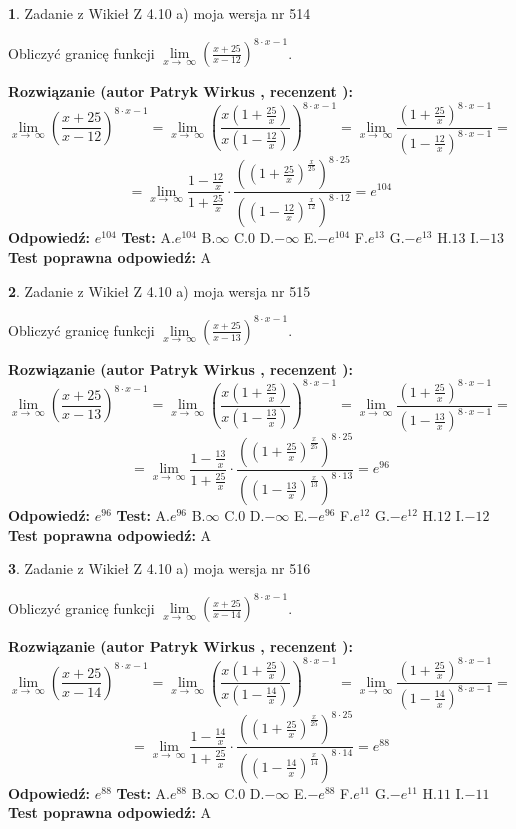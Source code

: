 \documentclass[12pt, a4paper]{article}
\theoremstyle{definition} %
\newtheorem{zad}{}
\newcommand{\zadStart}[1]{\begin{zad}#1\newline}
\newcommand{\zadStop}{\end{zad}}
\newcommand{\rozwStart}[2]{\noindent \textbf{Rozwiązanie (autor #1 , recenzent #2): }\newline}
\newcommand{\rozwStop}{\newline}
\newcommand{\odpStart}{\noindent \textbf{Odpowiedź:}\newline}
\newcommand{\odpStop}{\newline}
\newcommand{\testStart}{\noindent \textbf{Test:}\newline}
\newcommand{\testStop}{\newline}
\newcommand{\kluczStart}{\noindent \textbf{Test poprawna odpowiedź:}\newline}
\newcommand{\kluczStop}{\newline}
\begin{document}
\zadStart{Zadanie z Wikieł Z 4.10 a) moja wersja nr 514}

Obliczyć granicę funkcji  $\lim\limits_{x\to\ \infty}(\frac{x+25}{x-12})^{8\cdot x-1}$.
\zadStop
\rozwStart{Patryk Wirkus}{}
$$\lim\limits_{x\to\ \infty}(\frac{x+25}{x-12})^{8\cdot x-1} = \lim\limits_{x\to\ \infty}(\frac{x(1+\frac{25}{x})}{x(1-\frac{12}{x})})^{8\cdot x-1}=\lim\limits_{x\to\ \infty}\frac{(1+\frac{25}{x})^{8\cdot x-1}}{(1-\frac{12}{x})^{8\cdot x-1}}=$$
$$=\lim\limits_{x\to\ \infty}\frac{1-\frac{12}{x}}{1+\frac{25}{x}}\cdot\frac{((1+\frac{25}{x})^{\frac{x}{25}})^{8\cdot25}}{((1-\frac{12}{x})^{\frac{x}{12}})^{8\cdot12}}=e^{104}$$
\rozwStop
\odpStart
$e^{104}$
\odpStop
\testStart
A.$e^{104}$ B.$\infty$ C.$0$ D.$-\infty$ E.$-e^{104}$
F.$e^{13}$ G.$-e^{13}$
H.$13$
I.$-13$
\testStop
\kluczStart
A
\kluczStop



\zadStart{Zadanie z Wikieł Z 4.10 a) moja wersja nr 515}

Obliczyć granicę funkcji  $\lim\limits_{x\to\ \infty}(\frac{x+25}{x-13})^{8\cdot x-1}$.
\zadStop
\rozwStart{Patryk Wirkus}{}
$$\lim\limits_{x\to\ \infty}(\frac{x+25}{x-13})^{8\cdot x-1} = \lim\limits_{x\to\ \infty}(\frac{x(1+\frac{25}{x})}{x(1-\frac{13}{x})})^{8\cdot x-1}=\lim\limits_{x\to\ \infty}\frac{(1+\frac{25}{x})^{8\cdot x-1}}{(1-\frac{13}{x})^{8\cdot x-1}}=$$
$$=\lim\limits_{x\to\ \infty}\frac{1-\frac{13}{x}}{1+\frac{25}{x}}\cdot\frac{((1+\frac{25}{x})^{\frac{x}{25}})^{8\cdot25}}{((1-\frac{13}{x})^{\frac{x}{13}})^{8\cdot13}}=e^{96}$$
\rozwStop
\odpStart
$e^{96}$
\odpStop
\testStart
A.$e^{96}$ B.$\infty$ C.$0$ D.$-\infty$ E.$-e^{96}$
F.$e^{12}$ G.$-e^{12}$
H.$12$
I.$-12$
\testStop
\kluczStart
A
\kluczStop



\zadStart{Zadanie z Wikieł Z 4.10 a) moja wersja nr 516}

Obliczyć granicę funkcji  $\lim\limits_{x\to\ \infty}(\frac{x+25}{x-14})^{8\cdot x-1}$.
\zadStop
\rozwStart{Patryk Wirkus}{}
$$\lim\limits_{x\to\ \infty}(\frac{x+25}{x-14})^{8\cdot x-1} = \lim\limits_{x\to\ \infty}(\frac{x(1+\frac{25}{x})}{x(1-\frac{14}{x})})^{8\cdot x-1}=\lim\limits_{x\to\ \infty}\frac{(1+\frac{25}{x})^{8\cdot x-1}}{(1-\frac{14}{x})^{8\cdot x-1}}=$$
$$=\lim\limits_{x\to\ \infty}\frac{1-\frac{14}{x}}{1+\frac{25}{x}}\cdot\frac{((1+\frac{25}{x})^{\frac{x}{25}})^{8\cdot25}}{((1-\frac{14}{x})^{\frac{x}{14}})^{8\cdot14}}=e^{88}$$
\rozwStop
\odpStart
$e^{88}$
\odpStop
\testStart
A.$e^{88}$ B.$\infty$ C.$0$ D.$-\infty$ E.$-e^{88}$
F.$e^{11}$ G.$-e^{11}$
H.$11$
I.$-11$
\testStop
\kluczStart
A
\kluczStop
\end{document}
